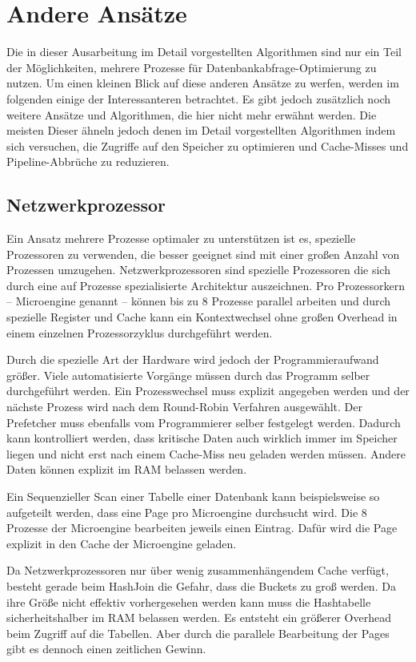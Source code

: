 \section{Andere Ansätze}
\label{sec:AndereAnsatze}
Die in dieser Ausarbeitung im Detail vorgestellten Algorithmen sind nur ein Teil der Möglichkeiten, mehrere Prozesse für Datenbankabfrage-Optimierung zu nutzen. Um einen kleinen Blick auf diese anderen Ansätze zu werfen, werden im folgenden einige der Interessanteren betrachtet. Es gibt jedoch zusätzlich noch weitere Ansätze und Algorithmen, die hier nicht mehr erwähnt werden. Die meisten Dieser ähneln jedoch denen im Detail vorgestellten Algorithmen indem sich versuchen, die Zugriffe auf den Speicher zu optimieren und Cache-Misses und Pipeline-Abbrüche zu reduzieren.

\subsection{Netzwerkprozessor}
\label{sec:Netzwerkprozessor}

Ein Ansatz mehrere Prozesse optimaler zu unterstützen ist es, spezielle Prozessoren zu verwenden, die besser geeignet sind mit einer großen Anzahl von Prozessen umzugehen. \cite{GOLD} Netzwerkprozessoren sind spezielle Prozessoren die sich durch eine auf Prozesse spezialisierte Architektur auszeichnen. Pro Prozessorkern – Microengine genannt – können bis zu 8 Prozesse parallel arbeiten und durch spezielle Register und Cache kann ein Kontextwechsel ohne großen Overhead in einem einzelnen Prozessorzyklus durchgeführt werden.

Durch die spezielle Art der Hardware wird jedoch der Programmieraufwand größer. Viele automatisierte Vorgänge müssen durch das Programm selber durchgeführt werden. Ein Prozesswechsel muss explizit angegeben werden und der nächste Prozess wird nach dem Round-Robin Verfahren ausgewählt. Der Prefetcher muss ebenfalls vom Programmierer selber festgelegt werden. Dadurch kann kontrolliert werden, dass kritische Daten auch wirklich immer im Speicher liegen und nicht erst nach einem Cache-Miss neu geladen werden müssen. Andere Daten können explizit im RAM belassen werden.

Ein Sequenzieller Scan einer Tabelle einer Datenbank kann beispielsweise so aufgeteilt werden, dass eine Page pro Microengine durchsucht wird. Die 8 Prozesse der Microengine bearbeiten jeweils einen Eintrag. Dafür wird die Page explizit in den Cache der Microengine geladen.

Da Netzwerkprozessoren nur über wenig zusammenhängendem Cache verfügt, besteht gerade beim HashJoin die Gefahr, dass die Buckets zu groß werden. Da ihre Größe nicht effektiv vorhergesehen werden kann muss die Hashtabelle sicherheitshalber im RAM belassen werden. Es entsteht ein größerer Overhead beim Zugriff auf die Tabellen. Aber durch die parallele Bearbeitung der Pages gibt es dennoch einen zeitlichen Gewinn.

